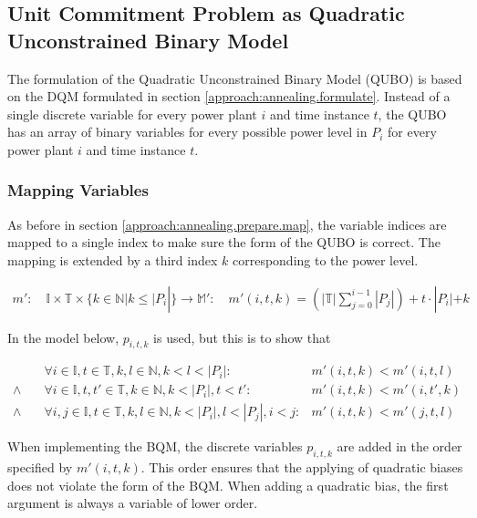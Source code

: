 \subsection{Unit Commitment Problem as Quadratic Unconstrained Binary Model}

The formulation of the Quadratic Unconstrained Binary Model (QUBO) is based on the DQM formulated in section \ref{approach:annealing.formulate}.
Instead of a single discrete variable for every power plant $i$ and time instance $t$, the QUBO has an array of binary variables for every possible power level in $P_i$ for every power plant $i$ and time instance $t$.

\subsubsection{Mapping Variables}

As before in section \ref{approach:annealing.prepare.map}, the variable indices are mapped to a single index to make sure the form of the QUBO is correct.
The mapping is extended by a third index $k$ corresponding to the power level.

\begin{align}
  m':
  \quad
  \mathbb{I}
  \times \mathbb{T}
  \times \{k \in \mathbb{N} | k \leq |P_i|\} \to \mathbb{M}':
  \quad
  m'(i, t, k) = \left( |\mathbb{T}| \sum_{j=0}^{i-1} |P_j| \right)
  + t \cdot |P_i|
  + k
  \label{formula:qubo.mapping}
\end{align}

In the model below, $p_{i,t,k}$ is used, but this is to show that

\begin{subequations}
\begin{align}
  &
  \forall i \in \mathbb{I}, t \in \mathbb{T}, k, l \in \mathbb{N}, k < l < |P_i|:
  &
  m'(i, t, k) < m'(i, t, l)
  \\
  \land \quad
  &
  \forall i \in \mathbb{I}, t, t' \in \mathbb{T}, k \in \mathbb{N}, k < |P_i|, t < t':
  &
  m'(i, t, k) < m'(i, t', k)
  \\
  \land \quad
  &
  \forall i, j \in \mathbb{I}, t  \in \mathbb{T}, k, l \in \mathbb{N}, k < |P_i|, l < |P_j|, i < j:
  &
  m'(i, t, k) < m'(j, t, l)
\end{align}
\end{subequations}

When implementing the BQM, the discrete variables $p_{i, t, k}$ are added in the order specified by $m'(i, t, k)$.
This order ensures that the applying of quadratic biases does not violate the form of the BQM.
When adding a quadratic bias, the first argument is always a variable of lower order.

